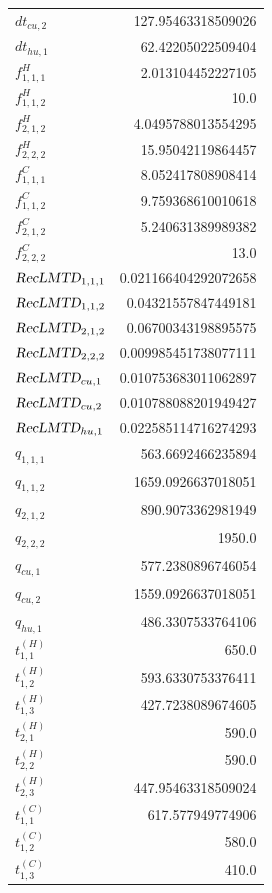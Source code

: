 \documentclass{article}%
\begin{document}
\begin{multicols*}{3}
\begin{supertabular}{lr}
	$dt_{cu,2}$ & 127.95463318509026 \\%
	$dt_{hu,1}$ & 62.42205022509404 \\%
	$f_{1,1,1}^{H}$ & 2.013104452227105 \\%
	$f_{1,1,2}^{H}$ & 10.0 \\%
	$f_{2,1,2}^{H}$ & 4.0495788013554295 \\%
	$f_{2,2,2}^{H}$ & 15.95042119864457 \\%
	$f_{1,1,1}^{C}$ & 8.052417808908414 \\%
	$f_{1,1,2}^{C}$ & 9.759368610010618 \\%
	$f_{2,1,2}^{C}$ & 5.240631389989382 \\%
	$f_{2,2,2}^{C}$ & 13.0 \\%
	$\textsl{RecLMTD}_{1,1,1}$ & 0.021166404292072658 \\%
	$\textsl{RecLMTD}_{1,1,2}$ & 0.04321557847449181 \\%
	$\textsl{RecLMTD}_{2,1,2}$ & 0.06700343198895575 \\%
	$\textsl{RecLMTD}_{2,2,2}$ & 0.009985451738077111 \\%
	$\textsl{RecLMTD}_{cu,1}$ & 0.010753683011062897 \\%
	$\textsl{RecLMTD}_{cu,2}$ & 0.010788088201949427 \\%
	$\textsl{RecLMTD}_{hu,1}$ & 0.022585114716274293 \\%
	$q_{1,1,1}$ & 563.6692466235894 \\%
	$q_{1,1,2}$ & 1659.0926637018051 \\%
	$q_{2,1,2}$ & 890.9073362981949 \\%
	$q_{2,2,2}$ & 1950.0 \\%
	$q_{cu,1}$ & 577.2380896746054 \\%
	$q_{cu,2}$ & 1559.0926637018051 \\%
	$q_{hu,1}$ & 486.3307533764106 \\%
	$t_{1,1}^{(H)}$ & 650.0 \\%
	$t_{1,2}^{(H)}$ & 593.6330753376411 \\%
	$t_{1,3}^{(H)}$ & 427.7238089674605 \\%
	$t_{2,1}^{(H)}$ & 590.0 \\%
	$t_{2,2}^{(H)}$ & 590.0 \\%
	$t_{2,3}^{(H)}$ & 447.95463318509024 \\%
	$t_{1,1}^{(C)}$ & 617.577949774906 \\%
	$t_{1,2}^{(C)}$ & 580.0 \\%
	$t_{1,3}^{(C)}$ & 410.0 \\%

\end{supertabular}
\end{multicols*}
\end{document}
